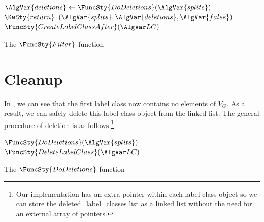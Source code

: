 \begin{algorithm}[htb]
{{{}
}
\medskip
\nl  $\AlgVar{deletions} \gets \FuncSty{DoDeletions}(\AlgVar{splits})$ \label{McSplitSIDoDeletions}\;
\medskip
\nl  $\KwSty{return}$ $(\AlgVar{splits}, \AlgVar{deletions}, \AlgVar{false})$ \label{ReturnFromFilter}\;
}
\;
\nl $\FuncSty{CreateLabelClassAfter}(\LC)$ \;
\nl {}
\caption{The $\FuncSty{Filter}$ function}
\label{McSplitSIAlgFilter}
\end{algorithm}

\FloatBarrier

\section{Cleanup}

In , we can see that the first label class
now contains no elements of $V_G$.  As a result, we can safely delete this label
class object from the linked list.  The general procedure of deletion is as
follows.\footnote{Our implementation has an extra pointer within each label
class object so we can store the deleted\_label\_classes list as a linked list
without the need for an external array of pointers.}


\begin{algorithm}[htb]
\AlgorithmFontSize
\DontPrintSemicolon
\nl $\FuncSty{DoDeletions}(\AlgVar{splits})$ \;
\nl {}
\;
\nl $\FuncSty{DeleteLabelClass}(\LC)$ \;
\nl {}
\caption{The $\FuncSty{DoDeletions}$ function}
\label{McSplitSIAlgDelete}
\end{algorithm}

